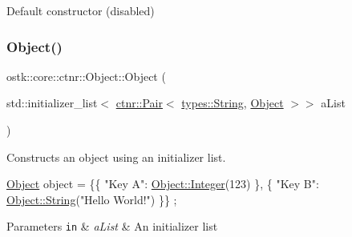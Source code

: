 Default constructor (disabled) 

\mbox{\label{classostk_1_1core_1_1ctnr_1_1_object_aaf1dbebfc8a63661fb2789f8dd286054}} 
\subsubsection{\texorpdfstring{Object()}{Object()}\hspace{0.1cm}{\footnotesize\ttfamily [2/3]}}
{\footnotesize\ttfamily ostk\+::core\+::ctnr\+::\+Object\+::\+Object (\begin{DoxyParamCaption}\item[{std\+::initializer\+\_\+list$<$ \hyperlink{namespaceostk_1_1core_1_1ctnr_a08e64f04352e3c432bff0cfd3b23923b}{ctnr\+::\+Pair}$<$ \hyperlink{classostk_1_1core_1_1types_1_1_string}{types\+::\+String}, \hyperlink{classostk_1_1core_1_1ctnr_1_1_object}{Object} $>$$>$}]{a\+List }\end{DoxyParamCaption})}



Constructs an object using an initializer list. 


\begin{DoxyCode}
\hyperlink{classostk_1_1core_1_1ctnr_1_1_object_a8e5ab6d15d9e28f3e2c65572f22aeb74}{Object} \textcolor{keywordtype}{object} = \{\{ \textcolor{stringliteral}{"Key A"}: \hyperlink{classostk_1_1core_1_1ctnr_1_1_object_af3bef3ae331e8e55662bf91a4cd5026f}{Object::Integer}(123) \}, \{ \textcolor{stringliteral}{"Key B"}: 
      \hyperlink{classostk_1_1core_1_1ctnr_1_1_object_aab792cff0163e7cd57c49afe36eea380}{Object::String}(\textcolor{stringliteral}{"Hello World!"}) \}\} ;
\end{DoxyCode}



\begin{DoxyParams}[1]{Parameters}
\mbox{\tt in}  & {\em a\+List} & An initializer list \\
\hline
\end{DoxyParams}
\mbox{\label{classostk_1_1core_1_1ctnr_1_1_object_a1d2f5d239649fce130631e7b592d5ec2}} 
